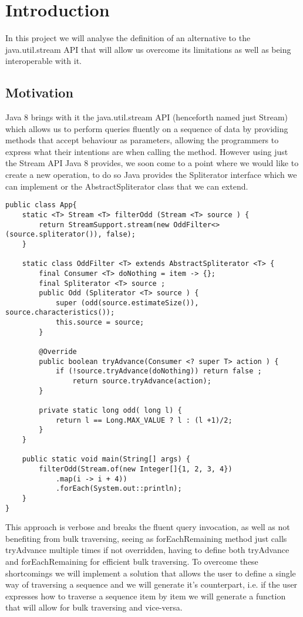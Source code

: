 \chapter{Introduction}
In this project we will analyse the definition of an alternative to the java.util.stream API that will allow us overcome its limitations as well as being interoperable with it.

\section{Motivation}

Java 8 brings with it the java.util.stream API (henceforth named just Stream) which allows us to perform queries fluently on a sequence of data by providing methods that accept behaviour as parameters, allowing the programmers to express what their intentions are when calling the method. However using just the Stream API Java 8 provides, we soon come to a point  where we would like to create a new operation, to do so Java provides the Spliterator interface which we can implement or the AbstractSpliterator class that we can extend.
\newpage
\begin{lstlisting}[caption={Spliterator Example},captionpos=b]
public class App{
	static <T> Stream <T> filterOdd (Stream <T> source ) {
		return StreamSupport.stream(new OddFilter<>(source.spliterator()), false);
	}

	static class OddFilter <T> extends AbstractSpliterator <T> {
		final Consumer <T> doNothing = item -> {};
		final Spliterator <T> source ;
		public Odd (Spliterator <T> source ) {
			super (odd(source.estimateSize()), source.characteristics());
			this.source = source;
		}
	
		@Override
		public boolean tryAdvance(Consumer <? super T> action ) {
			if (!source.tryAdvance(doNothing)) return false ;
				return source.tryAdvance(action);
		}
	
		private static long odd( long l) {
			return l == Long.MAX_VALUE ? l : (l +1)/2;
		}
	}

	public static void main(String[] args) {
		filterOdd(Stream.of(new Integer[]{1, 2, 3, 4})
            .map(i -> i + 4))
            .forEach(System.out::println);
	}
}
\end{lstlisting}
This approach is verbose and breaks the fluent query invocation, as well as not benefiting from bulk traversing, seeing as forEachRemaining\citep{spliterator} method just calls tryAdvance multiple times if not overridden, having to define both tryAdvance and forEachRemaining for efficient bulk traversing. To overcome these shortcomings we will implement a solution that allows the user to define a single way of traversing a sequence and we will generate it's counterpart, i.e. if the user expresses how to traverse a sequence item by item we will generate a function that will allow for bulk traversing and vice-versa.

